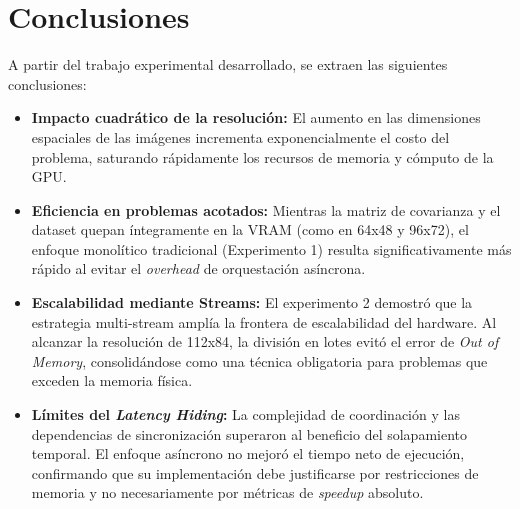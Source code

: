 \documentclass[12pt, a4paper]{article}
\begin{document}
\section{Conclusiones}

A partir del trabajo experimental desarrollado, se extraen las siguientes conclusiones:

\begin{itemize}
    \item \textbf{Impacto cuadrático de la resolución:} El aumento en las dimensiones espaciales de las imágenes incrementa exponencialmente el costo del problema, saturando rápidamente los recursos de memoria y cómputo de la GPU.
    
    \item \textbf{Eficiencia en problemas acotados:} Mientras la matriz de covarianza y el dataset quepan íntegramente en la VRAM (como en 64x48 y 96x72), el enfoque monolítico tradicional (Experimento 1) resulta significativamente más rápido al evitar el \textit{overhead} de orquestación asíncrona.
    
    \item \textbf{Escalabilidad mediante Streams:} El experimento 2 demostró que la estrategia multi-stream amplía la frontera de escalabilidad del hardware. Al alcanzar la resolución de 112x84, la división en lotes evitó el error de \textit{Out of Memory}, consolidándose como una técnica obligatoria para problemas que exceden la memoria física.
    
    \item \textbf{Límites del \textit{Latency Hiding}:} La complejidad de coordinación y las dependencias de sincronización superaron al beneficio del solapamiento temporal. El enfoque asíncrono no mejoró el tiempo neto de ejecución, confirmando que su implementación debe justificarse por restricciones de memoria y no necesariamente por métricas de \textit{speedup} absoluto.
\end{itemize}
\end{document}
